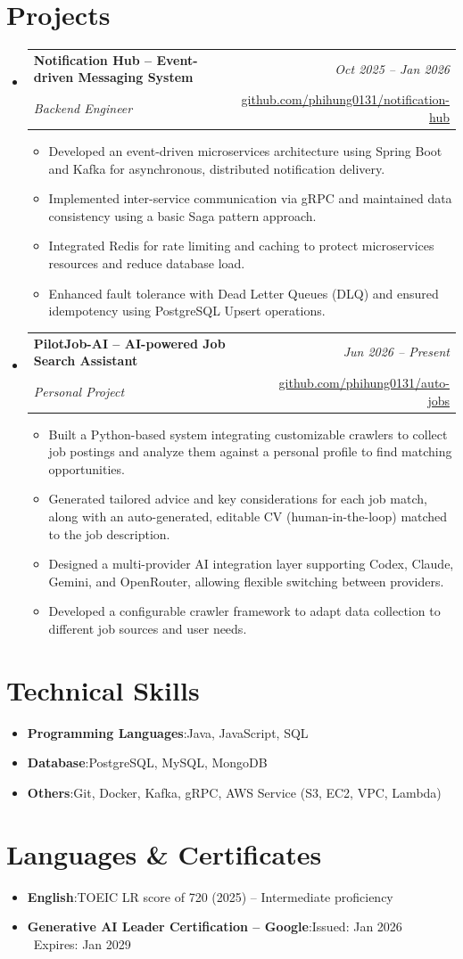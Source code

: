 \documentclass[a4paper,10pt]{article}
\makeatletter
\newcommand{\resumeItem}[2]{
    \item{\textbf{#1}{:\hspace{1.5mm}#2 \vspace{-0.5mm}}}
}
\newcommand{\resumeProject}[4]{
    \vspace{0.5mm}\item
    \begin{tabular*}{\linewidth}[t]{l@{\extracolsep{\fill}}r}
        \textbf{#1} & \textit{\footnotesize{#3}} \\
        \footnotesize{\textit{#2}} & \footnotesize{#4}
    \end{tabular*}
    \vspace{-3mm}
}
\newcommand{\resumeSubItem}[2]{\resumeItem{#1}{#2}\vspace{-4pt}}
\newcommand{\resumeSubHeadingListStart}{\begin{itemize}[leftmargin=*,labelsep=1.7mm,itemsep=0mm,topsep=0mm]}
\newcommand{\resumeSubHeadingListEnd}{\end{itemize}\vspace{0.5mm}}
\newcommand{\resumeHeadingSkillStart}{\begin{itemize}[leftmargin=*,itemsep=1.7mm]}
\newcommand{\resumeHeadingSkillEnd}{\end{itemize}\vspace{-2mm}}
\newcommand{\resumeItemListStart}{\begin{justify}\begin{itemize}[leftmargin=3.8ex, noitemsep, label=\raisebox{0.15ex}{\scalebox{0.75}{$\circ$}}, labelsep=1.4mm, labelwidth=1.8mm, topsep=0.4mm, parsep=0.2mm]\small}
\newcommand{\resumeItemListEnd}{\end{itemize}\end{justify}\vspace{-3mm}}
\makeatother
\begin{document}
\section{Projects}
\resumeSubHeadingListStart
    \resumeProject
      {Notification Hub -- Event-driven Messaging System}
      {Backend Engineer}
      {Oct 2025 -- Jan 2026}
      {\href{https://github.com/phihung0131/notification-hub}{github.com/phihung0131/notification-hub}}
      \resumeItemListStart
        \item Developed an event-driven microservices architecture using Spring Boot and Kafka for asynchronous, distributed notification delivery.
        \item Implemented inter-service communication via gRPC and maintained data consistency using a basic Saga pattern approach.
        \item Integrated Redis for rate limiting and caching to protect microservices resources and reduce database load.
        \item Enhanced fault tolerance with Dead Letter Queues (DLQ) and ensured idempotency using PostgreSQL Upsert operations.
      \resumeItemListEnd
    \resumeProject
      {PilotJob-AI -- AI-powered Job Search Assistant}
      {Personal Project}
      {Jun 2026 -- Present}
      {\href{https://github.com/phihung0131/auto-jobs}{github.com/phihung0131/auto-jobs}}
      \resumeItemListStart
        \item Built a Python-based system integrating customizable crawlers to collect job postings and analyze them against a personal profile to find matching opportunities.
        \item Generated tailored advice and key considerations for each job match, along with an auto-generated, editable CV (human-in-the-loop) matched to the job description.
        \item Designed a multi-provider AI integration layer supporting Codex, Claude, Gemini, and OpenRouter, allowing flexible switching between providers.
        \item Developed a configurable crawler framework to adapt data collection to different job sources and user needs.
      \resumeItemListEnd
\resumeSubHeadingListEnd

\section{Technical Skills}
\resumeHeadingSkillStart
    \resumeSubItem{Programming Languages}{Java, JavaScript, SQL}
    \resumeSubItem{Database}{PostgreSQL, MySQL, MongoDB}
    \resumeSubItem{Others}{Git, Docker, Kafka, gRPC, AWS Service (S3, EC2, VPC, Lambda)}
\resumeHeadingSkillEnd


\section{Languages \& Certificates}
\resumeHeadingSkillStart
    \resumeSubItem{English}{TOEIC LR score of 720 (2025) -- Intermediate proficiency}
    \resumeSubItem{Generative AI Leader Certification -- Google}{Issued: Jan 2026 \textperiodcentered\ Expires: Jan 2029}
\resumeHeadingSkillEnd
\end{document}
